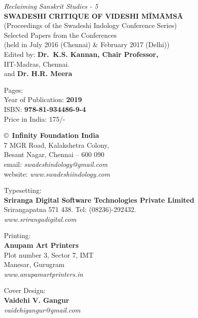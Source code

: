 \thispagestyle{empty}

\noindent
{\fontsize{9}{11}\selectfont\sl Reclaiming Sanskrit Studies - 5}\\
{\bf SWADESHI CRITIQUE OF VIDESHI MĪMĀṀSĀ}\\
(Proceedings of the Swadeshi Indology Conference Series)\\
Selected Papers from the Conferences\\
(held in July 2016 (Chennai) \& February 2017 (Delhi))\\
Edited by: {\bf Dr.\ K.S. Kannan, Chair Professor,}\\
IIT-Madras, Chennai.\\
and {\bf Dr. H.R. Meera}
\vfill

\noindent
Pages: {\bf\pageref{bookend}}\\
Year of Publication: {\bf 2019}\\
ISBN: {\bf 978-81-934486-9-4}\\
Price in India: 175/-
\vfill

\noindent
\copyright\ {\bf Infinity Foundation India}\\ 
7 MGR Road, Kalakshetra Colony,\\ 
Besant Nagar, Chennai -- 600 090\\
email: {\sl swadeshindology@gmail.com}\\
website: {\sl www.swadeshiindology.com} 
\vfill

\noindent
Typesetting:\\ 
{\bf Sriranga Digital Software Technologies Private Limited}\\ 
Srirangapatna 571 438. Tel: (08236)-292432.\\
{\sl www.srirangadigital.com}
\vfill

\noindent
Printing:\\
{\bf Anupam Art Printers}\\
Plot number 3, Sector 7, IMT\\
Manesar, Gurugram\\
{\sl www.anupamartprinters.in}
\bigskip

\noindent
Cover Design:\\ 
{\bf Vaidehi V. Gangur}\\
{\sl vaidehigangur@gmail.com}
